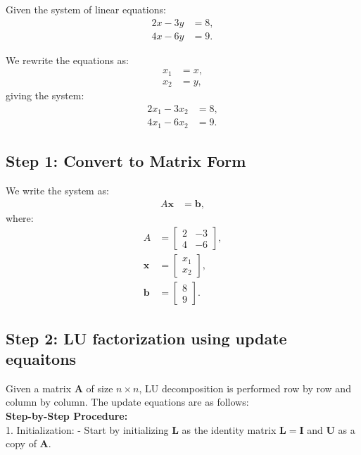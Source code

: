 \documentclass[journal]{IEEEtran}
\begin{document}
	Given the system of linear equations:
	\begin{align}
		2x - 3y &= 8, \label{eq1} \\
		4x - 6y &= 9. \label{eq2}
	\end{align}
	
	We rewrite the equations as:
	\begin{align}
		x_1 &= x, \\
		x_2 &= y,
	\end{align}
	giving the system:
	\begin{align}
		2x_1 - 3x_2 &= 8, \label{eq3} \\
		4x_1 - 6x_2 &= 9. \label{eq4}
	\end{align}
	
	\subsection*{Step 1: Convert to Matrix Form}
	We write the system as:
	\begin{align}
		A \mathbf{x} &= \mathbf{b},
	\end{align}
	where:
	\begin{align}
		A &= \begin{bmatrix} 2 & -3 \\ 4 & -6 \end{bmatrix}, \\
		\mathbf{x} &= \begin{bmatrix} x_1 \\ x_2 \end{bmatrix}, \\
		\mathbf{b} &= \begin{bmatrix} 8 \\ 9 \end{bmatrix}.
	\end{align}
	
	\subsection*{Step 2: LU factorization using update equaitons}
    Given a matrix $ \mathbf{A} $ of size $ n \times n $, LU decomposition is performed row by row and column by column. The update equations are as follows:\\
    \textbf{Step-by-Step Procedure:}\\
1. Initialization: 
   - Start by initializing $ \mathbf{L} $ as the identity matrix $ \mathbf{L} = \mathbf{I} $ and $ \mathbf{U} $ as a copy of $ \mathbf{A} $.
   
\end{document}
